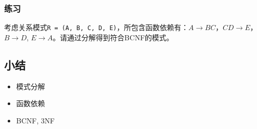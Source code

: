 \documentclass[aspectratio=169, 14pt]{beamer}
\begin{document}
\begin{frame}
    \frametitle{练习}

    考虑关系模式\texttt{R = (A, B, C, D, E)}，所包含函数依赖有：$A \rightarrow BC$，$CD \rightarrow E$，$B \rightarrow D$, $E \rightarrow A$。请通过分解得到符合BCNF的模式。  

\end{frame}

\begin{frame}
    \section{\textcolor{darkmidnightblue}{小结}}
    \begin{itemize}
        \item 模式分解
        \item 函数依赖
        \item BCNF, 3NF
    \end{itemize}
\end{frame}
\end{document}
